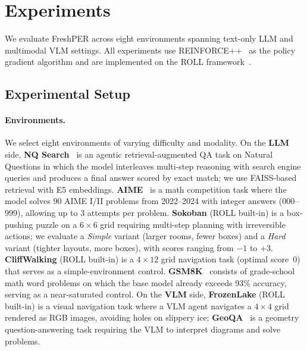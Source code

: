 \documentclass[runningheads]{llncs}
\newcommand{\method}{FreshPER}
\begin{document}
\section{Experiments}
\label{sec:experiments}

We evaluate \method{} across eight environments spanning text-only LLM and multimodal VLM settings. All experiments use REINFORCE++~\cite{hu2025reinforce++} as the policy gradient algorithm and are implemented on the ROLL framework~\cite{wang2025roll}.

\subsection{Experimental Setup}

\paragraph{Environments.}
We select eight environments of varying difficulty and modality. On the \textbf{LLM} side, \textbf{NQ Search}~\cite{jin2025searchr1} is an agentic retrieval-augmented QA task on Natural Questions in which the model interleaves multi-step reasoning with search engine queries and produces a final answer scored by exact match; we use FAISS-based retrieval with E5 embeddings. \textbf{AIME}~\cite{aimoValidationAime,aopsAimeArchive} is a math competition task where the model solves 90 AIME I/II problems from 2022--2024 with integer answers (000--999), allowing up to 3 attempts per problem. \textbf{Sokoban} (ROLL built-in) is a box-pushing puzzle on a $6{\times}6$ grid requiring multi-step planning with irreversible actions; we evaluate a \emph{Simple} variant (larger rooms, fewer boxes) and a \emph{Hard} variant (tighter layouts, more boxes), with scores ranging from $-1$ to $+3$. \textbf{CliffWalking} (ROLL built-in) is a $4{\times}12$ grid navigation task (optimal score~$0$) that serves as a simple-environment control. \textbf{GSM8K}~\cite{cobbe2021gsm8k} consists of grade-school math word problems on which the base model already exceeds 93\% accuracy, serving as a near-saturated control. On the \textbf{VLM} side, \textbf{FrozenLake} (ROLL built-in) is a visual navigation task where a VLM agent navigates a $4{\times}4$ grid rendered as RGB images, avoiding holes on slippery ice; \textbf{GeoQA}~\cite{chen2021geoqa} is a geometry question-answering task requiring the VLM to interpret diagrams and solve problems.
\end{document}
